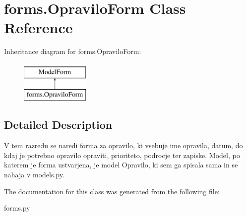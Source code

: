 \section{forms.\+Opravilo\+Form Class Reference}
\label{classforms_1_1_opravilo_form}
Inheritance diagram for forms.\+Opravilo\+Form\+:\begin{figure}[H]
\begin{center}
\leavevmode
\includegraphics[height=2.000000cm]{classforms_1_1_opravilo_form}
\end{center}
\end{figure}


\subsection{Detailed Description}
\begin{DoxyVerb}    V tem razredu se naredi forma za opravilo, ki vsebuje ime opravila, datum, do kdaj je potrebno opravilo opraviti, prioriteto, podrocje ter zapiske.
    Model, po katerem je forma ustvarjena, je model Opravilo, ki sem ga spisala sama in se nahaja v models.py.
\end{DoxyVerb}
 

The documentation for this class was generated from the following file\+:\begin{DoxyCompactItemize}
\item 
forms.\+py\end{DoxyCompactItemize}
